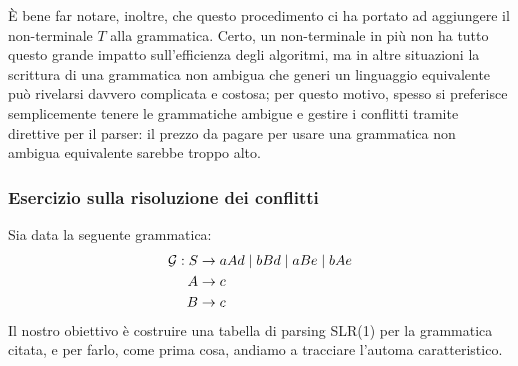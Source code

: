\documentclass[class=book, crop=false, oneside, 12pt]{standalone}
\begin{document}
È bene far notare, inoltre, che questo procedimento ci ha portato ad aggiungere il non-terminale \(T\) alla grammatica. Certo, un non-terminale in più non ha tutto questo grande impatto sull'efficienza degli algoritmi, ma in altre situazioni la scrittura di una grammatica non ambigua che generi un linguaggio equivalente può rivelarsi davvero complicata e costosa; per questo motivo, spesso si preferisce semplicemente tenere le grammatiche ambigue e gestire i conflitti tramite direttive per il parser: il prezzo da pagare per usare una grammatica non ambigua equivalente sarebbe troppo alto.

\subsubsection{Esercizio sulla risoluzione dei conflitti}
Sia data la seguente grammatica:
\begin{align}
    \label{eq:ex3-slr1-grammarr}
    \mathcal{G}: S &\to aAd \mid bBd \mid aBe \mid bAe \\
    A &\to c \nonumber \\ \notag
    B &\to c \notag
\end{align}
Il nostro obiettivo è costruire una tabella di parsing SLR(1) per la grammatica citata, e per farlo, come prima cosa, andiamo a tracciare l'automa caratteristico.
\end{document}
